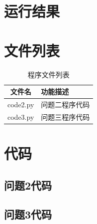 \documentclass[withoutpreface,bwprint]{cumcmthesis} %
\begin{document}
\newpage
\begin{appendices}

\section{运行结果}


\section{文件列表}
\begin{table}[H]
    \caption{程序文件列表}
    \centering
    \begin{tabularx}{0.85\textwidth}{c l}
        \bottomrule[1.5pt]
        文件名 & 功能描述 \\
        \midrule[1pt]
        code2.py & 问题二程序代码 \\
        code3.py & 问题三程序代码 \\
        \bottomrule[1.5pt]
    \end{tabularx}
    \label{tab:文件列表}
\end{table}

\section{代码}

\subsection{问题2代码}


\subsection{问题3代码}


\end{appendices}
\end{document}
